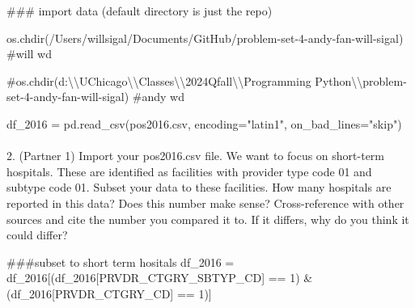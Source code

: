 \documentclass[
  letterpaper,
  DIV=11,
  numbers=noendperiod]{scrartcl}
\makeatletter
\let\oldparagraph\paragraph
\renewcommand{\paragraph}{
    \@ifstar
      \xxxParagraphStar
      \xxxParagraphNoStar
  }
\newcommand{\xxxParagraphStar}[1]{\oldparagraph*{#1}\mbox{}}
\newcommand{\xxxParagraphNoStar}[1]{\oldparagraph{#1}\mbox{}}
\newenvironment{Shaded}{\begin{snugshade}}{\end{snugshade}}
\newcommand{\CommentTok}[1]{\textcolor[rgb]{0.37,0.37,0.37}{#1}}
\newcommand{\DecValTok}[1]{\textcolor[rgb]{0.68,0.00,0.00}{#1}}
\newcommand{\NormalTok}[1]{\textcolor[rgb]{0.00,0.23,0.31}{#1}}
\newcommand{\OperatorTok}[1]{\textcolor[rgb]{0.37,0.37,0.37}{#1}}
\newcommand{\StringTok}[1]{\textcolor[rgb]{0.13,0.47,0.30}{#1}}
\makeatother
\begin{document}
\begin{Shaded}
\begin{Highlighting}[]
\CommentTok{\#\#\# import data (default directory is just the repo)}

\NormalTok{os.chdir(}\StringTok{\textquotesingle{}/Users/willsigal/Documents/GitHub/problem{-}set{-}4{-}andy{-}fan{-}will{-}sigal\textquotesingle{}}\NormalTok{) }\CommentTok{\#will wd}

\CommentTok{\#os.chdir(\textquotesingle{}d:\textbackslash{}\textbackslash{}UChicago\textbackslash{}\textbackslash{}Classes\textbackslash{}\textbackslash{}2024Qfall\textbackslash{}\textbackslash{}Programming Python\textbackslash{}\textbackslash{}problem{-}set{-}4{-}andy{-}fan{-}will{-}sigal\textquotesingle{}) \#andy wd}

\NormalTok{df\_2016 }\OperatorTok{=}\NormalTok{ pd.read\_csv(}\StringTok{\textquotesingle{}pos2016.csv\textquotesingle{}}\NormalTok{, encoding}\OperatorTok{=}\StringTok{"latin1"}\NormalTok{, on\_bad\_lines}\OperatorTok{=}\StringTok{"skip"}\NormalTok{)}
\end{Highlighting}
\end{Shaded}

\paragraph{2. (Partner 1) Import your pos2016.csv file. We want to focus
on short-term hospitals. These are identified as facilities with
provider type code 01 and subtype code 01. Subset your data to these
facilities. How many hospitals are reported in this data? Does this
number make sense? Cross-reference with other sources and cite the
number you compared it to. If it differs, why do you think it could
differ?}\label{partner-1-import-your-pos2016.csv-file.-we-want-to-focus-on-short-term-hospitals.-these-are-identified-as-facilities-with-provider-type-code-01-and-subtype-code-01.-subset-your-data-to-these-facilities.-how-many-hospitals-are-reported-in-this-data-does-this-number-make-sense-cross-reference-with-other-sources-and-cite-the-number-you-compared-it-to.-if-it-differs-why-do-you-think-it-could-differ}

\begin{Shaded}
\begin{Highlighting}[]
\CommentTok{\#\#\#subset to short term hositals}
\NormalTok{df\_2016 }\OperatorTok{=}\NormalTok{ df\_2016[(df\_2016[}\StringTok{\textquotesingle{}PRVDR\_CTGRY\_SBTYP\_CD\textquotesingle{}}\NormalTok{] }\OperatorTok{==} \DecValTok{1}\NormalTok{) }\OperatorTok{\&}\NormalTok{ (df\_2016[}\StringTok{\textquotesingle{}PRVDR\_CTGRY\_CD\textquotesingle{}}\NormalTok{] }\OperatorTok{==} \DecValTok{1}\NormalTok{)]}
\end{Highlighting}
\end{Shaded}
\end{document}
